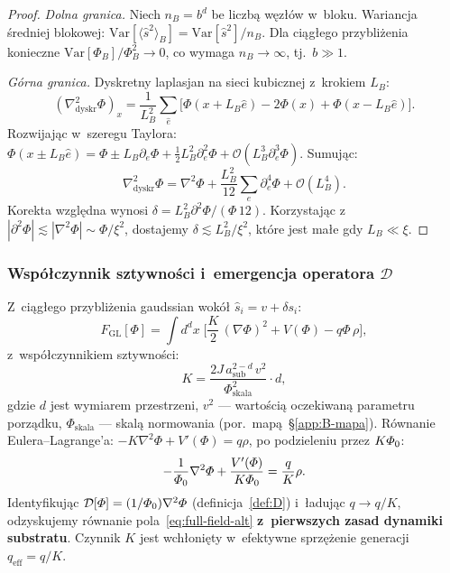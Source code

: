 \begin{proof}
\emph{Dolna granica.}
Niech $n_B = b^d$ be liczb\k{a} w\k{e}z\l{}\'ow w~bloku.
Wariancja \'sredniej blokowej:
$\mathrm{Var}[\langle\hat{s}^2\rangle_B]
= \mathrm{Var}[\hat{s}^2]/n_B$.
Dla ci\k{a}g\l{}ego przybli\.zenia konieczne
$\mathrm{Var}[\Phi_B]/\Phi_B^2 \to 0$, co wymaga $n_B \to \infty$,
tj.~$b \gg 1$.

\emph{G\'orna granica.}
Dyskretny laplasjan na sieci kubicznej z~krokiem $L_B$:
\begin{equation}
  (\nabla^2_{\mathrm{dyskr}}\Phi)_x
  = \frac{1}{L_B^2}\sum_{\hat{e}}\bigl[\Phi(x+L_B\hat{e})
    - 2\Phi(x) + \Phi(x-L_B\hat{e})\bigr].
\end{equation}
Rozwijaj\k{a}c w~szeregu Taylora:
$\Phi(x \pm L_B\hat{e}) = \Phi \pm L_B\partial_e\Phi
+ \tfrac{1}{2}L_B^2\partial_e^2\Phi
+ \mathcal{O}(L_B^3\partial_e^3\Phi)$.
Sumuj\k{a}c:
\begin{equation}
  \nabla^2_{\mathrm{dyskr}}\Phi
  = \nabla^2\Phi + \frac{L_B^2}{12}\sum_e\partial_e^4\Phi
    + \mathcal{O}(L_B^4).
\end{equation}
Korekta wzgl\k{e}dna wynosi
$\delta = L_B^2 \partial^2\Phi /(\Phi\,12)$.
Korzystaj\k{a}c z~$|\partial^2\Phi| \lesssim |\nabla^2\Phi|
\sim \Phi/\xi^2$, dostajemy $\delta \lesssim L_B^2/\xi^2$,
kt\'ore jest ma\l{}e gdy $L_B \ll \xi$.
\end{proof}

\subsubsection{Wsp\'o\l{}czynnik sztywno\'sci i~emergencja
  operatora $\mathcal{D}$}\label{app:B-stiffness}

Z~ci\k{a}g\l{}ego przybli\.zenia gaudssian wok\'o\l{}
$\hat{s}_i = v + \delta s_i$:
\begin{equation}\label{eq:B-GL-cont}
  F_{\mathrm{GL}}[\Phi] = \int d^d x\;\biggl[
    \frac{K}{2}\,(\nabla\Phi)^2 + V(\Phi) - q\Phi\,\rho
  \biggr],
\end{equation}
z~wsp\'o\l{}czynnikiem sztywno\'sci:
\begin{equation}\label{eq:B-stiffness}
  \boxed{
    K = \frac{2J\,a_{\mathrm{sub}}^{2-d}\,v^2}{\Phi_{\mathrm{skala}}^2}
    \cdot d,
  }
\end{equation}
gdzie $d$ jest wymiarem przestrzeni, $v^2$ --- warto\'sci\k{a}
oczekiwan\k{a} parametru porz\k{a}dku, $\Phi_{\mathrm{skala}}$
--- skal\k{a} normowania (por.\ map\k{a}~\S\ref{app:B-mapa}).
R\'ownanie Eulera--Lagrange'a:
$-K\nabla^2\Phi + V'(\Phi) = q\rho$,
po podzieleniu przez $K\varPhi_0$:
\begin{equation}
  -\frac{1}{\varPhi_0}\nabla^2\varPhi
  + \frac{V'(\varPhi)}{K\varPhi_0} = \frac{q}{K}\rho.
\end{equation}
Identyfikuj\k{a}c $\mathcal{D}[\varPhi] = (1/\varPhi_0)\nabla^2\varPhi$
(definicja~\ref{def:D}) i~\l{}aduj\k{a}c $q \to q/K$,
odzyskujemy r\'ownanie pola~\eqref{eq:full-field-alt}
\textbf{z~pierwszych zasad dynamiki substratu}.
Czynnik $K$ jest wch\l{}oni\k{e}ty w~efektywne sprz\k{e}\.zenie
generacji $q_{\mathrm{eff}} = q/K$.


